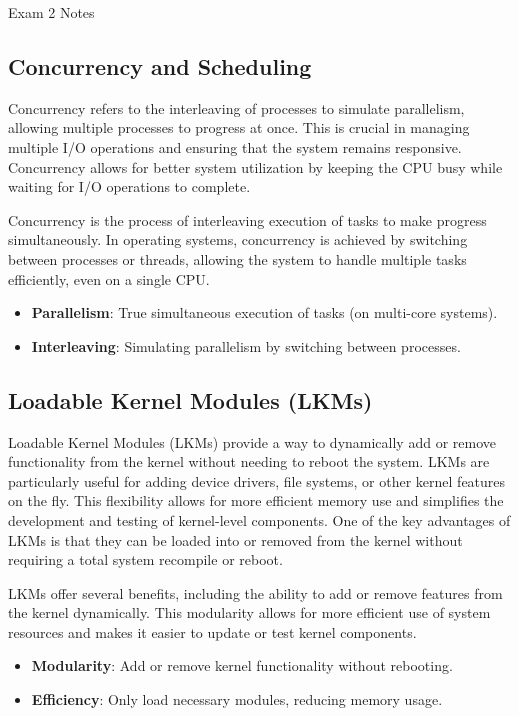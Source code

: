 \begin{examnotes}{Exam 2 Notes}
    \subsection*{Concurrency and Scheduling}
    
    Concurrency refers to the interleaving of processes to simulate parallelism, allowing multiple processes to progress at once. This is crucial in managing multiple I/O operations and ensuring that the 
    system remains responsive. Concurrency allows for better system utilization by keeping the CPU busy while waiting for I/O operations to complete.
    
    \begin{highlight}
        Concurrency is the process of interleaving execution of tasks to make progress simultaneously. In operating systems, concurrency is achieved by switching between processes or threads, allowing the 
        system to handle multiple tasks efficiently, even on a single CPU.
        \begin{itemize}
            \item \textbf{Parallelism}: True simultaneous execution of tasks (on multi-core systems).
            \item \textbf{Interleaving}: Simulating parallelism by switching between processes.
        \end{itemize}
    \end{highlight}
    
    \subsection*{Loadable Kernel Modules (LKMs)}
    
    Loadable Kernel Modules (LKMs) provide a way to dynamically add or remove functionality from the kernel without needing to reboot the system. LKMs are particularly useful for adding device drivers, 
    file systems, or other kernel features on the fly. This flexibility allows for more efficient memory use and simplifies the development and testing of kernel-level components. One of the key advantages 
    of LKMs is that they can be loaded into or removed from the kernel without requiring a total system recompile or reboot.
    
    \begin{highlight}
        LKMs offer several benefits, including the ability to add or remove features from the kernel dynamically. This modularity allows for more efficient use of system resources and makes it easier to 
        update or test kernel components.
        \begin{itemize}
            \item \textbf{Modularity}: Add or remove kernel functionality without rebooting.
            \item \textbf{Efficiency}: Only load necessary modules, reducing memory usage.
        \end{itemize}
    \end{highlight}
    

\end{examnotes}
